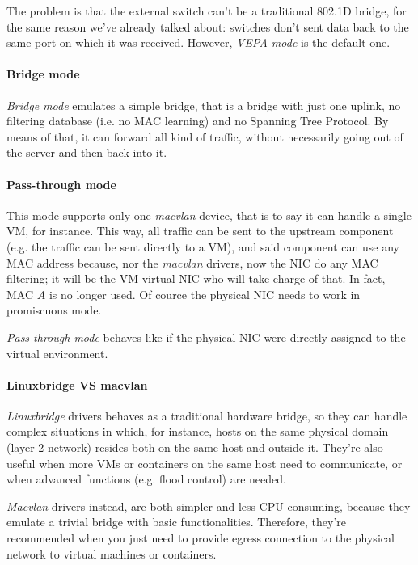 \noindent
The problem is that the external switch can't be a traditional 802.1D bridge, for
the same reason we've already talked about: switches don't sent data back to
the same port on which it was received. However, \emph{VEPA mode} is the default
one.

\paragraph{Bridge mode}
\emph{Bridge mode} emulates a simple bridge, that is a bridge with just one
uplink, no filtering database (i.e. no MAC learning) and no Spanning Tree
Protocol. By means of that, it can forward all kind of traffic, without
necessarily going out of the server and then back into it.

\paragraph{Pass-through mode}
This mode supports only one \emph{macvlan} device, that is to say it can handle
a single VM, for instance. This way, all traffic can be sent to the upstream
component (e.g. the traffic can be sent directly to a VM), and said component
can use any MAC address because, nor the \emph{macvlan} drivers, now the NIC
do any MAC filtering; it will be the VM virtual NIC who will take charge of that.
In fact, MAC $A$ is no longer used. Of cource the physical NIC needs to work in
promiscuous mode.

\begin{note}
    \emph{Pass-through mode} behaves like if the physical NIC were directly
    assigned to the virtual environment.
\end{note}

\paragraph{Linuxbridge VS macvlan}
\emph{Linuxbridge} drivers behaves as a traditional hardware bridge, so they can
handle complex situations in which, for instance, hosts on the same physical
domain (layer 2 network) resides both on the same host and outside it. They're
also useful when more VMs or containers on the same host need to communicate,
or when advanced functions (e.g. flood control) are needed.

\emph{Macvlan} drivers instead, are both simpler and less CPU consuming, because
they emulate a trivial bridge with basic functionalities. Therefore, they're
recommended when you just need to provide egress connection to the physical
network to virtual machines or containers.

